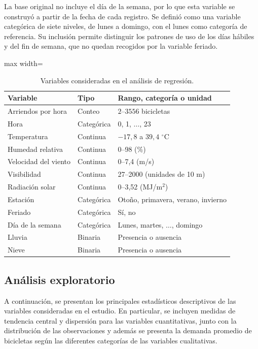 \documentclass[12pt, a4paper]{article}
\numberwithin{equation}{section}
\begin{document}
La base original no incluye el día de la semana, por lo que esta variable se construyó a partir de la fecha de cada registro. Se definió como una variable categórica de siete niveles, de lunes a domingo, con el lunes como categoría de referencia. Su inclusión permite distinguir los patrones de uso de los días hábiles y del fin de semana, que no quedan recogidos por la variable feriado.
\begin{table}[htbp]
\centering\small
\caption{Variables consideradas en el análisis de regresión.}
\begin{adjustbox}{max width=\linewidth}
\begin{tabular}{lll}
\toprule
Variable & Tipo & Rango, categoría o unidad \\
\midrule
Arriendos por hora & Conteo & $2$--$3556$ bicicletas \\
Hora & Categórica & 0, 1, $\ldots$, 23 \\
Temperatura & Continua & $-17{,}8$ a $39{,}4$ $^\circ$C \\
Humedad relativa & Continua & 0--98 (\%) \\
Velocidad del viento & Continua & 0--7{,}4 (m/s) \\
Visibilidad & Continua & 27--2000 (unidades de 10 m) \\
Radiación solar & Continua & 0--3{,}52 (MJ/m$^2$) \\
Estación & Categórica & Otoño, primavera, verano, invierno \\
Feriado & Categórica & Sí, no \\
Día de la semana & Categórica & Lunes, martes, $\ldots$, domingo \\
Lluvia & Binaria & Presencia o ausencia \\
Nieve & Binaria & Presencia o ausencia \\
\bottomrule
\end{tabular}
\end{adjustbox}
\end{table}

\newpage
\subsection{Análisis exploratorio}

A continuación, se presentan los principales estadísticos
descriptivos de las variables consideradas en el estudio. En particular, se incluyen medidas de tendencia central y
dispersión para las variables cuantitativas, junto con la
distribución de las observaciones y además se presenta la demanda promedio de
bicicletas según las diferentes categorías de las variables
cualitativas.
\end{document}
